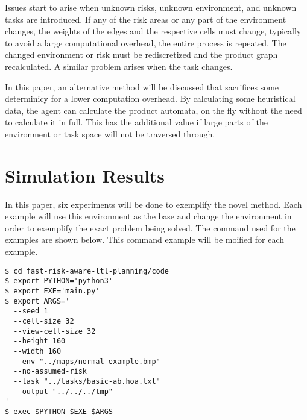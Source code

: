 \documentclass[letter paper, 10 pt, conference]{ieeeconf}
\begin{document}
Issues start to arise when unknown risks, unknown environment, and unknown tasks are introduced. If any of the risk areas or any part of the environment changes, the weights of the edges and the respective cells must change, typically to avoid a large computational overhead, the entire process is repeated. The changed environment or risk must be rediscretized and the product graph recalculated. A similar problem arises when the task changes.

In this paper, an alternative method will be discussed that sacrifices some determinicy for a lower computation overhead. By calculating some heuristical data, the agent can calculate the product automata, on the fly without the need to calculate it in full. This has the additional value if large parts of the environment or task space will not be traversed through.


\section{Simulation Results}
In this paper, six experiments will be done to exemplify the novel method. Each example will use this environment as the base and change the environment in order to exemplify the exact problem being solved. The command used for the examples are shown below. This command example will be moified for each example.

\begin{verbatim}
$ cd fast-risk-aware-ltl-planning/code
$ export PYTHON='python3'
$ export EXE='main.py'
$ export ARGS='
  --seed 1
  --cell-size 32
  --view-cell-size 32
  --height 160
  --width 160
  --env "../maps/normal-example.bmp"
  --no-assumed-risk
  --task "../tasks/basic-ab.hoa.txt"
  --output "../../../tmp"
'
$ exec $PYTHON $EXE $ARGS
\end{verbatim}
\end{document}
